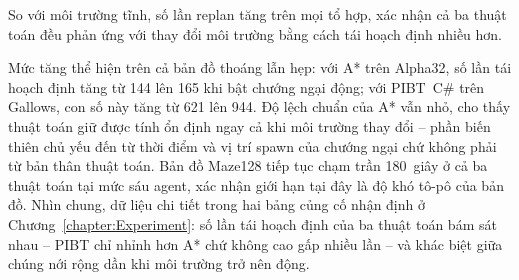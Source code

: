 \documentclass[../DoAn.tex]{subfiles}
\begin{document}
So với môi trường tĩnh, số lần replan tăng trên mọi tổ hợp, xác nhận cả ba thuật toán
đều phản ứng với thay đổi môi trường bằng cách tái hoạch định nhiều hơn.

Mức tăng thể hiện trên cả bản đồ thoáng lẫn hẹp: với A* trên Alpha32, số lần tái hoạch
định tăng từ 144 lên 165 khi bật chướng ngại động; với PIBT~C\# trên Gallows, con số này
tăng từ 621 lên 944. Độ lệch chuẩn của A* vẫn nhỏ, cho thấy thuật toán giữ được tính ổn
định ngay cả khi môi trường thay đổi -- phần biến thiên chủ yếu đến từ thời điểm và vị trí
spawn của chướng ngại chứ không phải từ bản thân thuật toán. Bản đồ Maze128 tiếp tục chạm
trần 180~giây ở cả ba thuật toán tại mức sáu agent, xác nhận giới hạn tại đây là độ khó
tô-pô của bản đồ. Nhìn chung, dữ liệu chi tiết trong hai bảng củng cố nhận định ở
Chương~\ref{chapter:Experiment}: số lần tái hoạch định của ba thuật toán bám sát nhau --
PIBT chỉ nhỉnh hơn A* chứ không cao gấp nhiều lần -- và khác biệt giữa chúng nới
rộng dần khi môi trường trở nên động.
\end{document}
